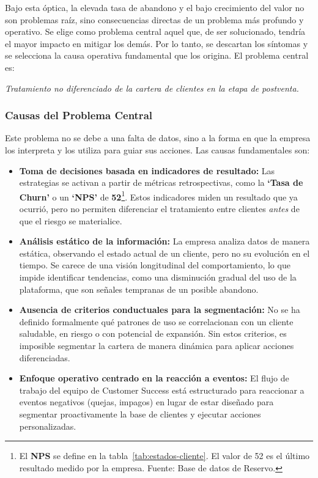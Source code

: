 Bajo esta óptica, la elevada tasa de abandono y el bajo crecimiento del valor no son problemas raíz, sino consecuencias directas de un problema más profundo y operativo. Se elige como problema central aquel que, de ser solucionado, tendría el mayor impacto en mitigar los demás. Por lo tanto, se descartan los síntomas y se selecciona la causa operativa fundamental que los origina. El problema central es:

\begin{center}
    \textit{Tratamiento no diferenciado de la cartera de clientes en la etapa de postventa.}
\end{center}

\subsubsection{Causas del Problema Central}
Este problema no se debe a una falta de datos, sino a la forma en que la empresa los interpreta y los utiliza para guiar sus acciones. Las causas fundamentales son:

\begin{itemize}
    \item \textbf{Toma de decisiones basada en indicadores de resultado:} Las estrategias se activan a partir de métricas retrospectivas, como la \textbf{`Tasa de Churn'} o un \textbf{`NPS'} de \textbf{52}\footnote{El \textbf{NPS} se define en la tabla~\ref{tab:estados-cliente}. El valor de 52 es el último resultado medido por la empresa. Fuente: Base de datos de Reservo.}. Estos indicadores miden un resultado que ya ocurrió, pero no permiten diferenciar el tratamiento entre clientes \textit{antes} de que el riesgo se materialice.

    \item \textbf{Análisis estático de la información:} La empresa analiza datos de manera estática, observando el estado actual de un cliente, pero no su evolución en el tiempo. Se carece de una visión longitudinal del comportamiento, lo que impide identificar tendencias, como una disminución gradual del uso de la plataforma, que son señales tempranas de un posible abandono.

    \item \textbf{Ausencia de criterios conductuales para la segmentación:} No se ha definido formalmente qué patrones de uso se correlacionan con un cliente saludable, en riesgo o con potencial de expansión. Sin estos criterios, es imposible segmentar la cartera de manera dinámica para aplicar acciones diferenciadas.

    \item \textbf{Enfoque operativo centrado en la reacción a eventos:} El flujo de trabajo del equipo de Customer Success está estructurado para reaccionar a eventos negativos (quejas, impagos) en lugar de estar diseñado para segmentar proactivamente la base de clientes y ejecutar acciones personalizadas.
\end{itemize}
